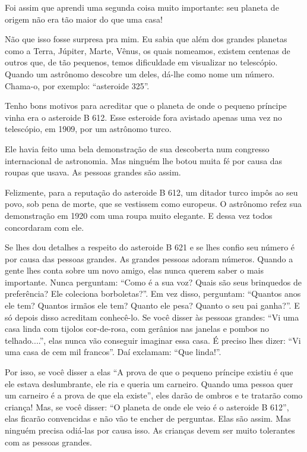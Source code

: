 Foi assim que aprendi uma segunda coisa muito importante: seu planeta de
origem não era tão maior do que uma casa!

Não que isso fosse surpresa pra mim. Eu sabia que além dos grandes
planetas como a Terra, Júpiter, Marte, Vênus, os quais nomeamos, existem
centenas de outros que, de tão pequenos, temos dificuldade em visualizar
no telescópio. Quando um astrônomo descobre um deles, dá-lhe como nome
um número. Chama-o, por exemplo: ``asteroide 325''.

Tenho bons motivos para acreditar que o planeta de onde o pequeno
príncipe vinha era o asteroide B 612. Esse esteroide fora avistado
apenas uma vez no telescópio, em 1909, por um astrônomo turco.

Ele havia feito uma bela demonstração de sua descoberta num congresso
internacional de astronomia. Mas ninguém lhe botou muita fé por causa
das roupas que usava. As pessoas grandes são assim.

Felizmente, para a reputação do asteroide B 612, um ditador turco impôs
ao seu povo, sob pena de morte, que se vestissem como europeus. O
astrônomo refez sua demonstração em 1920 com uma roupa muito elegante. E
dessa vez todos concordaram com ele.

Se lhes dou detalhes a respeito do asteroide B 621 e se lhes confio seu
número é por causa das pessoas grandes. As grandes pessoas adoram
números. Quando a gente lhes conta sobre um novo amigo, elas nunca
querem saber o mais importante. Nunca perguntam: ``Como é a sua voz?
Quais são seus brinquedos de preferência? Ele coleciona borboletas?''.
Em vez disso, perguntam: ``Quantos anos ele tem? Quantos irmãos ele tem?
Quanto ele pesa? Quanto o seu pai ganha?''. E só depois disso acreditam
conhecê-lo. Se você disser às pessoas grandes: ``Vi uma casa linda com
tijolos cor-de-rosa, com gerânios nas janelas e pombos no telhado....'',
elas nunca vão conseguir imaginar essa casa. É preciso lhes dizer: ``Vi
uma casa de cem mil francos''. Daí exclamam: ``Que linda!''.

Por isso, se você disser a elas ``A prova de que o pequeno príncipe
existiu é que ele estava deslumbrante, ele ria e queria um carneiro.
Quando uma pessoa quer um carneiro é a prova de que ela existe'', eles
darão de ombros e te tratarão como criança! Mas, se você disser: ``O
planeta de onde ele veio é o asteroide B 612'', elas ficarão convencidas
e não vão te encher de perguntas. Elas são assim. Mas ninguém precisa
odiá-las por causa isso. As crianças devem ser muito tolerantes com as
pessoas grandes.

